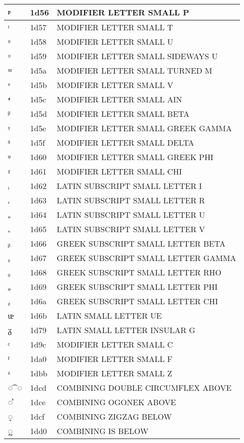 \documentclass[12pt,letterpaper,openany]{book}
\begin{document}
\begin{center}
\begin{supertabular}{|m{0.25in}|m{0.5in}|m{4in}|}
ᵖ & 1d56 & MODIFIER LETTER SMALL P\\\hline
ᵗ & 1d57 & MODIFIER LETTER SMALL T\\\hline
ᵘ & 1d58 & MODIFIER LETTER SMALL U\\\hline
ᵙ & 1d59 & MODIFIER LETTER SMALL SIDEWAYS U\\\hline
ᵚ & 1d5a & MODIFIER LETTER SMALL TURNED M\\\hline
ᵛ & 1d5b & MODIFIER LETTER SMALL V\\\hline
ᵜ & 1d5c & MODIFIER LETTER SMALL AIN\\\hline
ᵝ & 1d5d & MODIFIER LETTER SMALL BETA\\\hline
ᵞ & 1d5e & MODIFIER LETTER SMALL GREEK GAMMA\\\hline
ᵟ & 1d5f & MODIFIER LETTER SMALL DELTA\\\hline
ᵠ & 1d60 & MODIFIER LETTER SMALL GREEK PHI\\\hline
ᵡ & 1d61 & MODIFIER LETTER SMALL CHI\\\hline
ᵢ & 1d62 & LATIN SUBSCRIPT SMALL LETTER I\\\hline
ᵣ & 1d63 & LATIN SUBSCRIPT SMALL LETTER R\\\hline
ᵤ & 1d64 & LATIN SUBSCRIPT SMALL LETTER U\\\hline
ᵥ & 1d65 & LATIN SUBSCRIPT SMALL LETTER V\\\hline
ᵦ & 1d66 & GREEK SUBSCRIPT SMALL LETTER BETA\\\hline
ᵧ & 1d67 & GREEK SUBSCRIPT SMALL LETTER GAMMA\\\hline
ᵨ & 1d68 & GREEK SUBSCRIPT SMALL LETTER RHO\\\hline
ᵩ & 1d69 & GREEK SUBSCRIPT SMALL LETTER PHI\\\hline
ᵪ & 1d6a & GREEK SUBSCRIPT SMALL LETTER CHI\\\hline
ᵫ & 1d6b & LATIN SMALL LETTER UE\\\hline
ᵹ & 1d79 & LATIN SMALL LETTER INSULAR G\\\hline
ᶜ & 1d9c & MODIFIER LETTER SMALL C\\\hline
ᶠ & 1da0 & MODIFIER LETTER SMALL F\\\hline
ᶻ & 1dbb & MODIFIER LETTER SMALL Z\\\hline
◌ ᷍ ◌ & 1dcd & COMBINING DOUBLE CIRCUMFLEX ABOVE\\\hline
◌ ᷎ & 1dce & COMBINING OGONEK ABOVE\\\hline
◌᷏ & 1dcf & COMBINING ZIGZAG BELOW\\\hline
◌᷐ & 1dd0 & COMBINING IS BELOW\\\hline

\end{supertabular}
\end{center}
\end{document}
